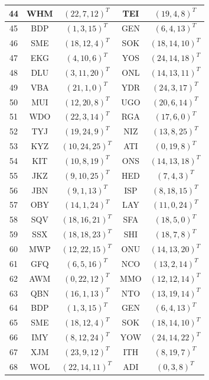 \begin{longtable}{|c|c|c|c|c|}
  \hline
  44 & WHM & $(22, 7, 12)^T$ & TEI & $(19, 4, 8)^T$ \\
  \hline
  45 & BDP & $(1, 3, 15)^T$ & GEN & $(6, 4, 13)^T$ \\
  \hline
  46 & SME & $(18, 12, 4)^T$ & SOK & $(18, 14, 10)^T$ \\
  \hline
  47 & EKG & $(4, 10, 6)^T$ & YOS & $(24, 14, 18)^T$ \\
  \hline
  48 & DLU & $(3, 11, 20)^T$ & ONL & $(14, 13, 11)^T$ \\
  \hline
  49 & VBA & $(21, 1, 0)^T$ & YDR & $(24, 3, 17)^T$ \\
  \hline
  50 & MUI & $(12, 20, 8)^T$ & UGO & $(20, 6, 14)^T$ \\
  \hline
  51 & WDO & $(22, 3, 14)^T$ & RGA & $(17, 6, 0)^T$ \\
  \hline
  52 & TYJ & $(19, 24, 9)^T$ & NIZ & $(13, 8, 25)^T$ \\
  \hline
  53 & KYZ & $(10, 24, 25)^T$ & ATI & $(0, 19, 8)^T$ \\
  \hline
  54 & KIT & $(10, 8, 19)^T$ & ONS & $(14, 13, 18)^T$ \\
  \hline
  55 & JKZ & $(9, 10, 25)^T$ & HED & $(7, 4, 3)^T$ \\
  \hline
  56 & JBN & $(9, 1, 13)^T$ & ISP & $(8, 18, 15)^T$ \\
  \hline
  57 & OBY & $(14, 1, 24)^T$ & LAY & $(11, 0, 24)^T$ \\
  \hline
  58 & SQV & $(18, 16, 21)^T$ & SFA & $(18, 5, 0)^T$ \\
  \hline
  59 & SSX & $(18, 18, 23)^T$ & SHI & $(18, 7, 8)^T$ \\
  \hline
  60 & MWP & $(12, 22, 15)^T$ & ONU & $(14, 13, 20)^T$ \\
  \hline
  61 & GFQ & $(6, 5, 16)^T$ & NCO & $(13, 2, 14)^T$ \\
  \hline
  62 & AWM & $(0, 22, 12)^T$ & MMO & $(12, 12, 14)^T$ \\
  \hline
  63 & QBN & $(16, 1, 13)^T$ & NTO & $(13, 19, 14)^T$ \\
  \hline
  64 & BDP & $(1, 3, 15)^T$ & GEN & $(6, 4, 13)^T$ \\
  \hline
  65 & SME & $(18, 12, 4)^T$ & SOK & $(18, 14, 10)^T$ \\
  \hline
  66 & IMY & $(8, 12, 24)^T$ & YOW & $(24, 14, 22)^T$ \\
  \hline
  67 & XJM & $(23, 9, 12)^T$ & ITH & $(8, 19, 7)^T$ \\
  \hline
  68 & WOL & $(22, 14, 11)^T$ & ADI & $(0, 3, 8)^T$ \\

\end{longtable}
